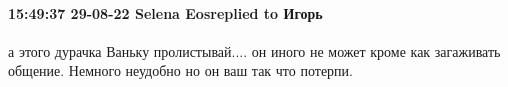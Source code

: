  
 
 
 
 

\paragraph{15:49:37 29-08-22 Selena Eosreplied to Игорь}

а этого дурачка Ваньку пролистывай.... он иного не может кроме как загаживать
общение. Немного неудобно но он ваш так что потерпи.
